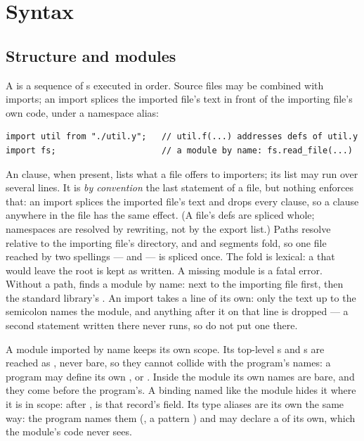 \section{Syntax}
\label{sec:grammar}

\subsection{Structure and modules}

A  is a sequence of s executed in order.
Source files may be combined with imports; an import splices the
imported file's text in front of the importing file's own code, under a
namespace alias:

\begin{lstlisting}
import util from "./util.y";   // util.f(...) addresses defs of util.y
import fs;                     // a module by name: fs.read_file(...)
\end{lstlisting}

\noindent An  clause, when present, lists what a
file offers to importers; its list may run over several lines. It is
\emph{by convention} the last statement of a file, but nothing enforces
that: an import splices the imported file's text and drops every
 clause, so a clause anywhere in the file has the same
effect. (A file's defs are spliced whole; namespaces are resolved by
rewriting, not by the export list.) Paths resolve relative to the
importing file's directory, and  and  segments fold, so
one file reached by two spellings ---  and
 --- is spliced once. The fold is lexical: a  that
would leave the root is kept as written. A missing module is a fatal
error. Without a
path,  finds a module by name:  next to the
importing file first, then the standard library's . An
import takes a line of its own: only the text up to the semicolon names
the module, and anything after it on that line is dropped --- a second
statement written there never runs, so do not put one there.

A module imported by name keeps its own scope. Its top-level s
and s are reached as , never bare, so they
cannot collide with the program's names: a program may define its own
, or . Inside the module its own
names are bare, and they come before the program's. A binding named
like the module hides it where it is in scope: after
,  is that record's field. Its type
aliases are its own the same way: the program names them 
(, a pattern ) and
may declare a  of its own, which the module's code never sees.


